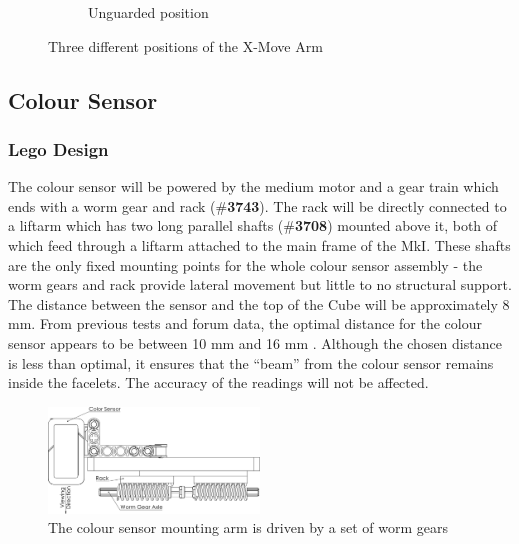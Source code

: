 \documentclass{report}
\newcommand{\tbo}[1]{\textbf{#1}}
\newcommand{\legopiece}[1]{(\#\tbo{#1})}
\begin{document}
\begin{figure}[H]
\begin{subfigure}[b]{0.30811\textwidth}
			\caption{Unguarded position}
			\label{fig:rdrXMoveArmV1_3}
		\end{subfigure}
		\caption{Three different positions of the X-Move Arm}
		\label{fig:rdrXMoveArmV1}
	\end{figure}
	

	\subsection{Colour Sensor}
	
	\subsubsection{Lego Design}
	
	The colour sensor will be powered by the medium motor and a gear train which ends with a worm gear and rack \legopiece{3743}. The rack will be directly connected to a liftarm which has two long parallel shafts \legopiece{3708} mounted above it, both of which feed through a liftarm attached to the main frame of the MkI. These shafts are the only fixed mounting points for the whole colour sensor assembly - the worm gears and rack provide lateral movement but little to no structural support. The distance between the sensor and the top of the Cube will be approximately 8 \si{\milli\metre}. From previous tests and forum data, the optimal distance for the colour sensor appears to be between 10 \si{\milli\metre} and 16 \si{\milli\metre} \cite{UlfR2015}. Although the chosen distance is less than optimal, it ensures that the \enquote{beam} from the colour sensor remains inside the facelets. The accuracy of the readings will not be affected.
	
	\begin{figure}[H]
		\centering
		\includegraphics[width=0.5\textwidth]{Resources/Images/dwgColorSensor.png}
		\caption{The colour sensor mounting arm is driven by a set of worm gears}
		\label{fig:dwgColorSensor}
	\end{figure}
	
\end{document}
